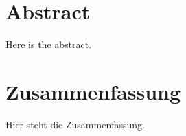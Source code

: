 \thispagestyle{empty}


\section*{Abstract}

Here is the abstract.


\section*{Zusammenfassung}

Hier steht die Zusammenfassung.



\dccrandkeywordsen

\pagebreak
